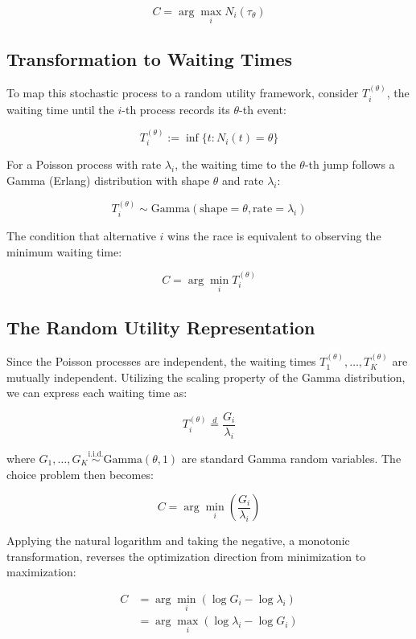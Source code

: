 \documentclass[
  man,
  floatsintext,
  longtable,
  a4paper,
  nolmodern,
  notxfonts,
  notimes,
  colorlinks=true,linkcolor=blue,citecolor=blue,urlcolor=blue]{apa7}
\begin{document}
\[
C = \arg \max_{i} N_i(\tau_{\theta})
\]

\subsection{Transformation to Waiting
Times}\label{transformation-to-waiting-times}

To map this stochastic process to a random utility framework, consider
\(T_i^{(\theta)}\), the waiting time until the \(i\)-th process records
its \(\theta\)-th event:

\[
T_i^{(\theta)} := \inf \{t : N_i(t) = \theta \}
\]

For a Poisson process with rate \(\lambda_i\), the waiting time to the
\(\theta\)-th jump follows a Gamma (Erlang) distribution with shape
\(\theta\) and rate \(\lambda_i\):

\[
T_i^{(\theta)} \sim \text{Gamma}(\text{shape}=\theta, \text{rate}=\lambda_i)
\]

The condition that alternative \(i\) wins the race is equivalent to
observing the minimum waiting time:

\[
C = \arg \min_{i} T_i^{(\theta)}
\]

\subsection{The Random Utility
Representation}\label{the-random-utility-representation}

Since the Poisson processes are independent, the waiting times
\(T_1^{(\theta)}, \ldots, T_K^{(\theta)}\) are mutually independent.
Utilizing the scaling property of the Gamma distribution, we can express
each waiting time as:

\[
T_i^{(\theta)} \stackrel{d}{=} \frac{G_i}{\lambda_i}
\]

where
\(G_1, \ldots, G_K \stackrel{\text{i.i.d.}}{\sim} \text{Gamma}(\theta, 1)\)
are standard Gamma random variables. The choice problem then becomes:

\[
C = \arg \min_{i} \left( \frac{G_i}{\lambda_i} \right)
\]

Applying the natural logarithm and taking the negative, a monotonic
transformation, reverses the optimization direction from minimization to
maximization:

\[
\begin{aligned} C &= \arg \min_{i} (\log G_i - \log \lambda_i) \\ &= \arg \max_{i} (\log \lambda_i - \log G_i) \end{aligned}
\]
\end{document}
